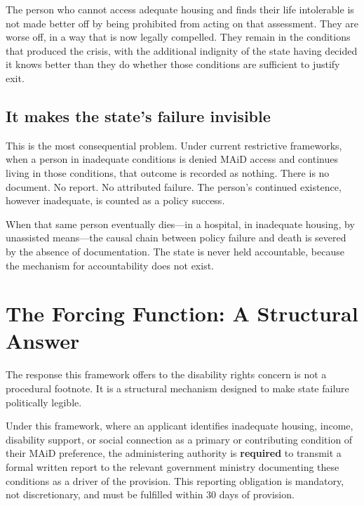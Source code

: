 \documentclass[11pt, letterpaper]{article}
\begin{document}
The person who cannot access adequate housing and finds their life intolerable is not made
better off by being prohibited from acting on that assessment. They are worse off, in a way
that is now legally compelled. They remain in the conditions that produced the crisis, with
the additional indignity of the state having decided it knows better than they do whether
those conditions are sufficient to justify exit.

\subsection{It makes the state's failure invisible}

This is the most consequential problem. Under current restrictive frameworks, when a person
in inadequate conditions is denied MAiD access and continues living in those conditions,
that outcome is recorded as nothing. There is no document. No report. No attributed failure.
The person's continued existence, however inadequate, is counted as a policy success.

When that same person eventually dies---in a hospital, in inadequate housing, by
unassisted means---the causal chain between policy failure and death is severed by the
absence of documentation. The state is never held accountable, because the mechanism for
accountability does not exist.

\section{The Forcing Function: A Structural Answer}

The response this framework offers to the disability rights concern is not a procedural
footnote. It is a structural mechanism designed to make state failure politically legible.

\begin{findingbox}[title={\sffamily\bfseries\small\color{C@accent}
  The Core Mechanism}]
Under this framework, where an applicant identifies inadequate housing, income, disability
support, or social connection as a primary or contributing condition of their MAiD
preference, the administering authority is \textbf{required} to transmit a formal written
report to the relevant government ministry documenting these conditions as a driver of the
provision. This reporting obligation is mandatory, not discretionary, and must be fulfilled
within 30 days of provision.
\end{findingbox}
\end{document}
